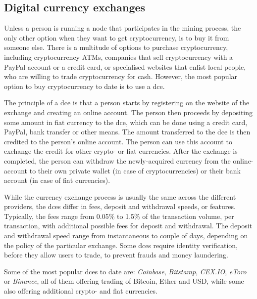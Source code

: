 \subsection{Digital currency exchanges}\label{sec:exchanges}

Unless a person is running a node that participates in the mining process, the only other option when they want to get cryptocurrency, is to buy it from someone else. There is a multitude of options to purchase cryptocurrency, including cryptocurrency ATMs, companies that sell cryptocurrency with a PayPal account or a credit card, or specialised websites that enlist local people, who are willing to trade cryptocurrency for cash. However, the most popular option to buy cryptocurrency to date is to use a \acrfull{dce}. 

The principle of a \acrshort{dce} is that a person starts by registering on the website of the exchange and creating an online account. The person then proceeds by depositing some amount in fiat currency to the \acrshort{dce}, which can be done using a credit card, PayPal, bank transfer or other means. The amount transferred to the \acrshort{dce} is then credited to the person's online account. The person can use this account to exchange the credit for other crypto- or fiat currencies. After the exchange is completed, the person can withdraw the newly-acquired currency from the online-account to their own private wallet (in case of cryptocurrencies) or their bank account (in case of fiat currencies).

While the currency exchange process is usually the same across the different providers, the \acrshort{dce}s differ in fees, deposit and withdrawal speeds, or features. Typically, the fees range from 0.05\% to 1.5\% of the transaction volume, per transaction, with additional possible fees for deposit and withdrawal\footnotemark. The deposit and withdrawal speed range from instantaneous to couple of days, depending on the policy of the particular exchange.%
% 
% 
Some \acrshort{dce}s require identity verification, before they allow users to trade, to prevent frauds and money laundering.\footnotemark
% 

Some of the most popular \acrshort{dce}s to date are: \textit{Coinbase}, \textit{Bitstamp}, \textit{CEX.IO}, \textit{eToro} or \textit{Binance}\footnotemark, all of them offering trading of Bitcoin, Ether and USD, while some also offering additional crypto- and fiat currencies.
% 
